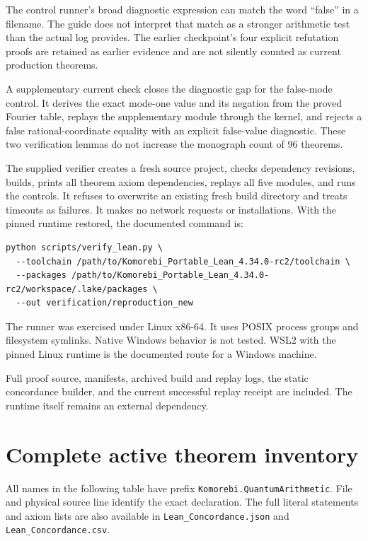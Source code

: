 The control runner's broad diagnostic expression can match the word ``false''
in a filename. The guide does not interpret that match as a stronger arithmetic
test than the actual log provides. The earlier checkpoint's four explicit
refutation proofs are retained as earlier evidence and are not silently counted
as current production theorems.

A supplementary current check closes the diagnostic gap for the false-mode control. It derives the exact mode-one value and its negation from the proved Fourier table, replays the supplementary module through the kernel, and rejects a false rational-coordinate equality with an explicit false-value diagnostic. These two verification lemmas do not increase the monograph count of 96 theorems.

The supplied verifier creates a fresh source project, checks dependency revisions,
builds, prints all theorem axiom dependencies, replays all five modules, and runs
the controls. It refuses to overwrite an existing fresh build directory and
treats timeouts as failures. It makes no network requests or installations.
With the pinned runtime restored, the documented command is:

\begin{Verbatim}[breaklines=true,fontsize=\footnotesize]
python scripts/verify_lean.py \
  --toolchain /path/to/Komorebi_Portable_Lean_4.34.0-rc2/toolchain \
  --packages /path/to/Komorebi_Portable_Lean_4.34.0-rc2/workspace/.lake/packages \
  --out verification/reproduction_new
\end{Verbatim}
The runner was exercised under Linux x86-64. It uses POSIX process groups and
filesystem symlinks. Native Windows behavior is not tested. WSL2 with the pinned
Linux runtime is the documented route for a Windows machine.

Full proof source, manifests, archived build and replay logs, the static
concordance builder, and the current successful replay receipt are
included. The runtime itself remains an external dependency.

\section{Complete active theorem inventory}
All names in the following table have prefix
\texttt{Komorebi.QuantumArithmetic}. File and physical source line identify the
exact declaration. The full literal statements and axiom lists are also available
in \texttt{Lean\_Concordance.json} and \texttt{Lean\_Concordance.csv}.

